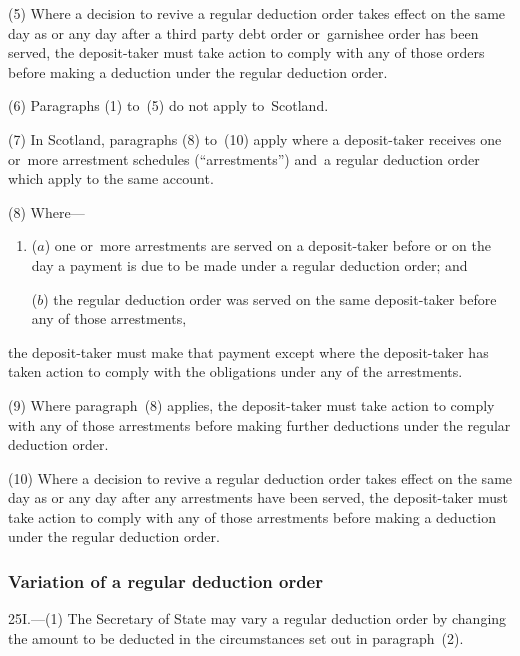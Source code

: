 \documentclass[12pt,a4paper]{article}
\begin{document}
(5) Where a decision to revive a regular deduction order takes effect on the same day as or any day after a third party debt order or~garnishee order has been served, the deposit-taker must take action to comply with any of those orders before making a deduction under the regular deduction order.

(6) Paragraphs (1) to~(5) do not apply to~Scotland.

(7) In Scotland, paragraphs (8) to~(10) apply where a deposit-taker receives one or~more arrestment schedules (“arrestments”) and~a regular deduction order which apply to the same account.

(8) Where—
\begin{enumerate}\item[]
($a$) one or~more arrestments are served on a deposit-taker before or on the day a payment is due to be made under a regular deduction order; and

($b$) the regular deduction order was served on the same deposit-taker before any of those arrestments,
\end{enumerate}
the deposit-taker must make that payment except where the deposit-taker has taken action to comply with the obligations under any of the arrestments.

(9) Where paragraph~(8) applies, the deposit-taker must take action to comply with any of those arrestments before making further deductions under the regular deduction order.

(10) Where a decision to revive a regular deduction order takes effect on the same day as or any day after any arrestments have been served, the deposit-taker must take action to comply with any of those arrestments before making a deduction under the regular deduction order.

\subsubsection[25I. Variation of a regular deduction order]{Variation of a regular deduction order}

25I.---(1)  The 
Secretary of State  %
may vary a regular deduction order by changing the amount to be deducted in the circumstances set out in paragraph~(2).
\end{document}
